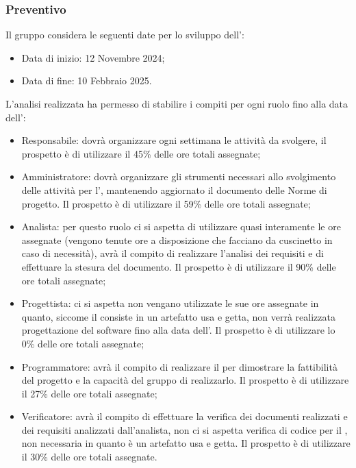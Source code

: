 \subsubsection{Preventivo}
Il gruppo considera le seguenti date per lo sviluppo dell':
\begin{itemize}
    \item Data di inizio: 12 Novembre 2024;
    \item Data di fine: 10 Febbraio 2025.
\end{itemize}
L'analisi realizzata ha permesso di stabilire i compiti per ogni ruolo fino alla data dell':
\begin{itemize}
\item Responsabile: dovrà organizzare ogni settimana le attività da svolgere, il prospetto è di utilizzare il 45\% delle ore totali assegnate;

\item Amministratore: dovrà organizzare gli strumenti necessari allo svolgimento delle attività per l', mantenendo aggiornato il documento delle Norme di progetto.
Il prospetto è di utilizzare il 59\% delle ore totali assegnate;

\item Analista: per questo ruolo ci si aspetta di utilizzare quasi interamente le ore assegnate (vengono tenute ore a disposizione che facciano da cuscinetto in caso di necessità), avrà il compito di realizzare l'analisi dei requisiti e di effettuare la stesura del documento.
Il prospetto è di utilizzare il 90\% delle ore totali assegnate;

\item Progettista: ci si aspetta non vengano utilizzate le sue ore assegnate in quanto, siccome il  consiste in un artefatto usa e getta, non verrà realizzata progettazione del software fino alla data dell'.
Il prospetto è di utilizzare lo 0\% delle ore totali assegnate;

\item Programmatore: avrà il compito di realizzare il  per dimostrare la fattibilità del progetto e la capacità del gruppo di realizzarlo.
Il prospetto è di utilizzare il 27\% delle ore totali assegnate;

\item Verificatore: avrà il compito di effettuare la verifica dei documenti realizzati e dei requisiti analizzati dall'analista, non ci si aspetta verifica di codice per il , non necessaria in quanto è un artefatto usa e getta.
Il prospetto è di utilizzare il 30\% delle ore totali assegnate.
\end{itemize}
